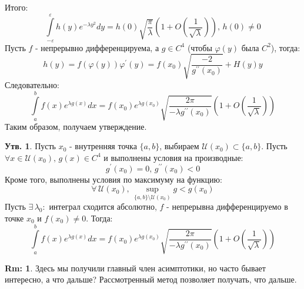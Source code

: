 \documentclass[12pt]{article}
\newcommand{\MU}{\mathcal{U}}
\newcommand{\VE}{\varepsilon}
\theoremstyle{definition}
\newtheorem{rem}{Rm:}
\newtheorem{prop}{Утв.}
\newcommand{\ddint}[2]{\displaystyle\int\limits_{#1}^{#2}}
\begin{document}
Итого:
$$
	\ddint{-\VE}{\VE}h(y)e^{-\lambda y^2}dy = h(0)\sqrt{\dfrac{\pi}{\lambda}}\left(1 + O\left(\dfrac{1}{\sqrt{\lambda}}\right)\right), \, h(0) \neq 0
$$
Пусть $f$ - непрерывно дифференцируема, а $g \in C^4$ (чтобы $\varphi(y)$ была $C^2$), тогда: 
$$
	h(y) = f\left(\varphi(y)\right)\varphi^\prime(y) = f(x_0)\sqrt{\dfrac{-2}{g^{\prime\prime}(x_0) }} + H(y)y
$$
Следовательно:
$$
	\ddint{a}{b}f(x)e^{\lambda g(x)}dx = f(x_0)e^{\lambda g(x_0)}\sqrt{\dfrac{2 \pi}{-\lambda g^{\prime\prime}(x_0)}}\left(1 + O\left(\dfrac{1}{\sqrt{\lambda}}\right)\right)
$$
Таким образом, получаем утверждение.
\begin{prop}
	Пусть $x_0$ - внутренняя точка $\{a,b\}$, выбираем $\MU(x_0)\subset \{a,b\}$. Пусть $\forall x \in \MU(x_0), \, g(x) \in C^4$ и выполнены условия на производные: 
	$$
		g^\prime(x_0) = 0, \, g^{\prime\prime}(x_0) < 0
	$$
	Кроме того, выполнены условия по максимуму на функцию:
	$$
		\forall \, \MU(x_0), \, \sup\limits_{\{a,b\} \setminus \MU(x_0)} g < g(x_0)
	$$
	Пусть $\exists \, \lambda_0 \colon$ интеграл сходится абсолютно, $f$ - непрерывна дифференцируемо в точке $x_0$ и $f(x_0) \neq 0$. Тогда:
	$$
		\ddint{a}{b}f(x)e^{\lambda g(x)}dx = f(x_0)e^{\lambda g(x_0)}\sqrt{\dfrac{2 \pi}{-\lambda g^{\prime\prime}(x_0)}}\left(1 + O\left(\dfrac{1}{\sqrt{\lambda}}\right)\right)
	$$
\end{prop}
\begin{rem}
	Здесь мы получили главный член асимптотики, но часто бывает интересно, а что дальше? Рассмотренный метод позволяет получать, что дальше.
\end{rem}

\newpage
\end{document}
